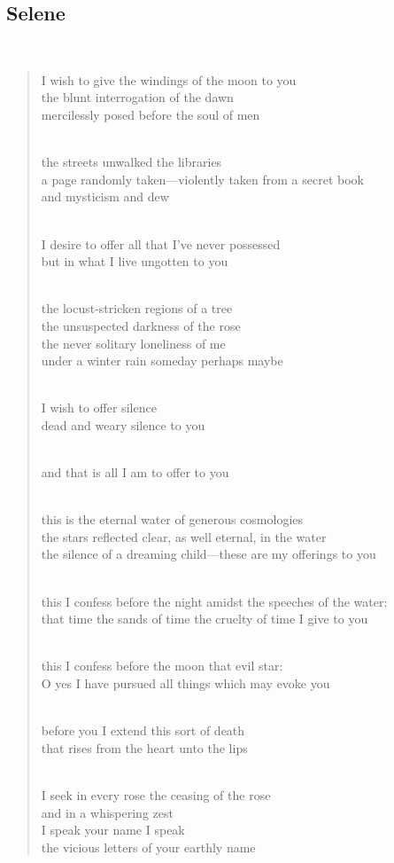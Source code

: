 \documentclass[a4paper, 12pt]{article}
\begin{document}
\subsection{Selene}
~ 
\begin{verse}
    
I wish to give the windings of the moon to you\\
the blunt interrogation of the dawn\\
mercilessly posed before the soul of men\\
~ 

the streets unwalked the libraries\\
a page randomly taken—violently taken from a secret book\\
and mysticism and dew\\
~ 

I desire to offer all that I’ve never possessed\\
but in what I live ungotten to you\\
~ 

the locust-stricken regions of a tree\\
the unsuspected darkness of the rose\\
the never solitary loneliness of me\\
under a winter rain someday perhaps maybe\\
~ 

I wish to offer silence\\
dead and weary silence to you\\
~ 

and that is all I am to offer to you\\
~ 

this is the eternal water of generous cosmologies\\
the stars reflected clear, as well eternal, in the water\\
the silence of a dreaming child—these are my offerings to you\\
~ 

this I confess before the night amidst the speeches of the water:\\
that time the sands of time the cruelty of time I give to you\\
~ 

this I confess before the moon that evil star:\\
O yes I have pursued all things which may evoke you\\
~ 

before you I extend this sort of death\\
that rises from the heart unto the lips\\
~ 

I seek in every rose the ceasing of the rose\\
and in a whispering zest\\
I speak your name I speak\\
the vicious letters of your earthly name\\
\end{verse}
\end{document}
